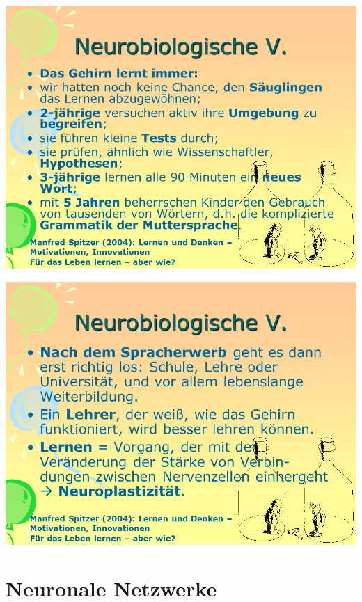 \documentclass[
  letterpaper,
]{scrbook}
\begin{document}
\includegraphics[width=1\textwidth,height=\textheight]{./pictures/neuro/Diapozitiv16.PNG}

\includegraphics[width=1\textwidth,height=\textheight]{./pictures/neuro/Diapozitiv17.PNG}

\hypertarget{neuronale-netzwerke}{%
\section{Neuronale Netzwerke}\label{neuronale-netzwerke}}
\end{document}
